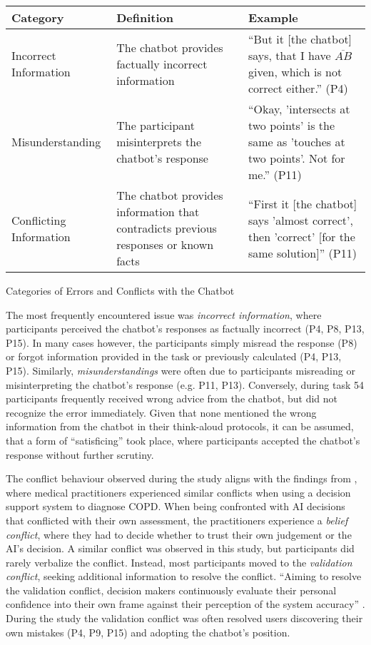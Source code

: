 \begin{ctable}
    \begin{tabularx}{\textwidth}{l|X|X}
        \textbf{Category} & \textbf{Definition} & \textbf{Example} \\
        \hline
        Incorrect Information & The chatbot provides factually incorrect information & “But it [the chatbot] says, that I have $\overline{AB}$ given, which is not correct either.” (P4) \\
        Misunderstanding & The participant misinterprets the chatbot's response & “Okay, 'intersects at two points' is the same as 'touches at two points'. Not for me.” (P11) \\
        Conflicting Information & The chatbot provides information that contradicts previous responses or known facts & “First it [the chatbot] says 'almost correct', then 'correct' [for the same solution]” (P11) \\
    \end{tabularx}
    \caption{Categories of Errors and Conflicts with the Chatbot}
    \label{tab:conflicts_errors}
\end{ctable}

The most frequently encountered issue was \textit{incorrect information}, where participants perceived the chatbot's responses as factually incorrect (P4, P8, P13, P15). In many cases however, the participants simply misread the response (P8) or forgot information provided in the task or previously calculated (P4, P13, P15). Similarly, \textit{misunderstandings} were often due to participants misreading or misinterpreting the chatbot's response (e.g. P11, P13). Conversely, during task 54 participants frequently received wrong advice from the chatbot, but did not recognize the error immediately. Given that none mentioned the wrong information from the chatbot in their think-aloud protocols, it can be assumed, that a form of “satisficing” \parencite{Simon1955} took place, where participants accepted the chatbot's response without further scrutiny.

The conflict behaviour observed during the study aligns with the findings from \cite{Jussupow2021}, where medical practitioners experienced similar conflicts when using a decision support system to diagnose \ac{COPD}. When being confronted with AI decisions that conflicted with their own assessment, the practitioners experience a \textit{belief conflict}, where they had to decide whether to trust their own judgement or the AI's decision. A similar conflict was observed in this study, but participants did rarely verbalize the conflict. Instead, most participants moved to the \textit{validation conflict}, seeking additional information to resolve the conflict. “Aiming to resolve the validation conflict, decision makers continuously evaluate their personal confidence into their own frame against their perception of the system accuracy” \parencite{Jussupow2021}. During the study the validation conflict was often resolved users discovering their own mistakes (P4, P9, P15) and adopting the chatbot's position.

